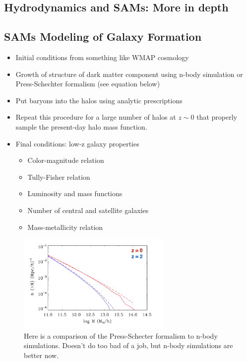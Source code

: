 \documentclass{article}
\begin{document}
\subsection{Hydrodynamics and SAMs: More in depth}

\subsection{SAMs Modeling of Galaxy Formation}

\begin{itemize}
    \item Initial conditions from something like WMAP cosmology
    \item Growth of structure of dark matter component using n-body simulation or Press-Schechter formalism (see equation below)
    \item Put baryons into the halos using analytic prescriptions
    \item Repeat this procedure for a large number of halos at $z\sim 0 $ that properly sample the present-day halo mass function.
    \item Final conditions: low-z galaxy properties
    \begin{itemize}
        \item Color-magnitude relation
        \item Tully-Fisher relation
        \item Luminosity and mass functions
        \item Number of central and satellite galaxies
        \item Mass-metallicity relation
    \end{itemize}
\end{itemize}

\begin{figure}
    \centering
    \includegraphics[width=0.66\textwidth]{figs/Screen Shot 2021-11-17 at 10.20.49 AM.png}
    \caption{Here is a comparison of the Press-Schecter formalism to n-body simulations. Doesn't do too bad of a job, but n-body simulations are better now. }
    \label{fig:ps_comp_nbody}
\end{figure}
\end{document}
